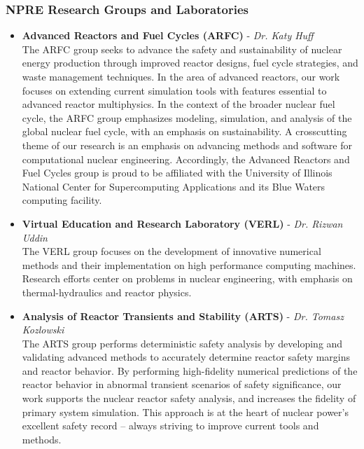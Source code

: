 \documentclass[11pt, letterpaper]{article}
\begin{document}
\subsubsection{NPRE Research Groups and Laboratories}
\begin{itemize}
  \item \textbf{Advanced Reactors and Fuel Cycles (ARFC)} - \textit{Dr. Katy Huff}\\
  The ARFC group seeks to advance the safety and sustainability of nuclear energy production through improved reactor designs, fuel cycle strategies, and waste management techniques. In the area of advanced reactors, our work focuses on extending current simulation tools with features essential to advanced reactor multiphysics. In the context of the broader nuclear fuel cycle, the ARFC group emphasizes modeling, simulation, and analysis of the global nuclear fuel cycle, with an emphasis on sustainability. A crosscutting theme of our research is an emphasis on advancing methods and software for computational nuclear engineering. Accordingly, the Advanced Reactors and Fuel Cycles group is proud to be affiliated with the University of Illinois National Center for Supercomputing Applications and its Blue Waters computing facility.
  \item \textbf{Virtual Education and Research Laboratory (VERL)} - \textit{Dr. Rizwan Uddin}\\
  The VERL group focuses on the development of innovative numerical methods and their implementation on high performance computing machines. Research efforts center on problems in nuclear engineering, with emphasis on thermal-hydraulics and reactor physics.

  \item \textbf{Analysis of Reactor Transients and Stability (ARTS)} - \textit{Dr. Tomasz Kozlowski}\\
  The ARTS group performs deterministic safety analysis by developing and validating advanced methods to accurately determine reactor safety margins and reactor behavior. By performing high-fidelity numerical predictions of the reactor behavior in abnormal transient scenarios of safety significance, our work supports the nuclear reactor safety analysis, and increases the fidelity of primary system simulation. This approach is at the heart of nuclear power’s excellent safety record – always striving to improve current tools and methods.


\end{itemize}
\end{document}
